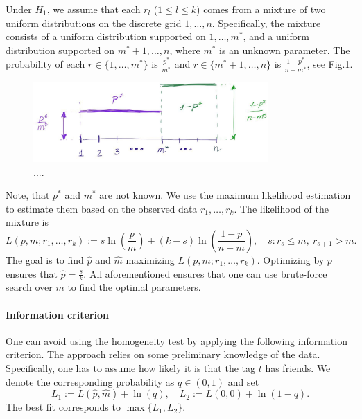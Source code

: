 Under $H_1$, we assume that each $r_l$ ($1\le l \le k$) comes from a mixture of two uniform distributions on the discrete grid $1, \dots, n$.
Specifically, the mixture consists of a uniform distribution supported on $1, \dots, m^*$, and a uniform distribution supported on $m^* + 1, \dots, n$, where $m^*$ is an unknown parameter. The probability of each $r \in \{1, \dots, m^*\}$ is $\frac{p^{*}}{m^*}$ and $r \in \{ m^*+1, \dots, n\}$ is $\frac{1 - p^{*}}{n - m^*}$,
see Fig.\ref{fig:model}.
\begin{figure}
 \centering
\includegraphics[width=0.8\textwidth]{model.jpeg}
 \caption{....}
 \label{fig:model}
\end{figure}

Note, that $p^*$ and $m^*$ are not known.
We use the maximum likelihood estimation to estimate them based on the observed data $r_1, \dots, r_k$. The likelihood of the mixture is
\[
L(p, m; r_1, \dots, r_k) := s\ln\left(\frac{p}{m}\right) + (k-s)\ln\left(\frac{1-p}{n - m}\right),
\quad
s: r_{s} \le m, ~r_{s+1} > m.
\]
The goal is to find $\hat{p}$ and $\hat{m}$ maximizing $L(p, m; r_1, \dots, r_k)$. Optimizing by $p$ ensures that $\hat{p} = \frac{s}{k}$. All aforementioned ensures that one can use brute-force search over $m$ to find the optimal parameters.

\paragraph{Information criterion}
One can avoid using the homogeneity test by applying the following information criterion.
The approach relies on some preliminary knowledge of the data. Specifically, one has to assume how likely it is that the tag $t$ has friends. We denote the corresponding probability as $q \in (0, 1)$ and set
\[
L_1 := L(\hat{p}, \hat{m}) + \ln(q),
\quad
L_2 := L(0, 0) + \ln(1-q).
\]
The best fit corresponds to $\max\{L_1, L_2\}$.


